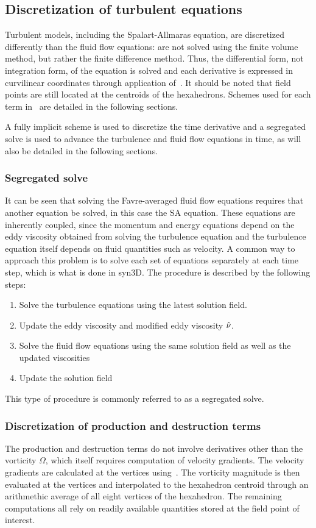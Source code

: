 \subsection{Discretization of turbulent equations}
\label{sec:synturb}
Turbulent models, including the Spalart-Allmaras equation, are discretized differently than the fluid flow equations: are not solved using the finite volume method, but rather the finite difference method. Thus, the differential form, not integration form, of the equation is solved and each derivative is expressed in curvilinear coordinates through application of~. It should be noted that field points are still located at the centroids of the hexahedrons. Schemes used for each term in~ are detailed in the following sections. 

A fully implicit scheme is used to discretize the time derivative and a segregated solve is used to advance the turbulence and fluid flow equations in time, as will also be detailed in the following sections.
%
\subsubsection{Segregated solve}
%
It can be seen that solving the Favre-averaged fluid flow equations requires that another equation be solved, in this case the SA equation. These equations are inherently coupled, since the momentum and energy equations depend on the eddy viscosity obtained from solving the turbulence equation and the turbulence equation itself depends on fluid quantities such as velocity. A common way to approach this problem is to solve each set of equations separately at each time step, which is what is done in syn3D. The procedure is described by the following steps:
\begin{enumerate}
    \item Solve the turbulence equations using the latest solution field. 
    \item Update the eddy viscosity and modified eddy viscosity $\sa$.
    \item Solve the fluid flow equations using the same solution field as well as the updated viscosities
    \item Update the solution field
\end{enumerate}
This type of procedure is commonly referred to as a segregated solve.
%
\subsubsection{Discretization of production and destruction terms}
The production and destruction terms do not involve derivatives other than the vorticity $\Omega$, which itself requires computation of velocity gradients. The velocity gradients are calculated at the vertices using~. The vorticity magnitude is then evaluated at the vertices and interpolated to the hexahedron centroid through an arithmethic average of all eight vertices of the hexahedron. The remaining computations all rely on readily available quantities stored at the field point of interest.
%
